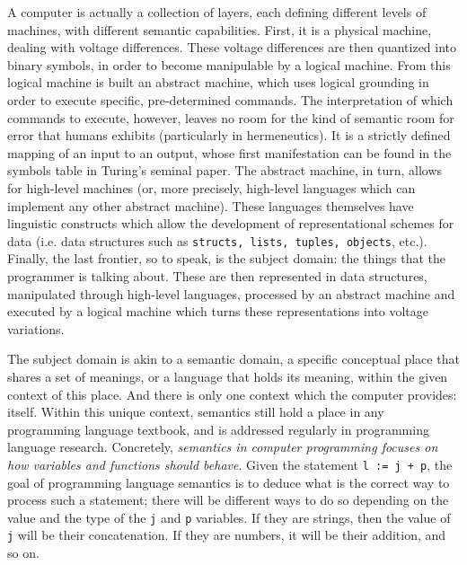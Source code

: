 \documentclass{article}
\begin{document}
A computer is actually a collection of layers, each defining different levels of machines, with different semantic capabilities. First, it is a physical machine, dealing with voltage differences. These voltage differences are then quantized into binary symbols, in order to become manipulable by a logical machine. From this logical machine is built an abstract machine, which uses logical grounding in order to execute specific, pre-determined commands. The interpretation of which commands to execute, however, leaves no room for the kind of semantic room for error that humans exhibits (particularly in hermeneutics). It is a strictly defined mapping of an input to an output, whose first manifestation can be found in the symbols table in Turing's seminal paper. The abstract machine, in turn, allows for high-level machines (or, more precisely, high-level languages which can implement any other abstract machine). These languages themselves have linguistic constructs which allow the development of representational schemes for data (i.e. data structures such as \lstinline{structs, lists, tuples, objects}, etc.). Finally, the last frontier, so to speak, is the subject domain: the things that the programmer is talking about. These are then represented in data structures, manipulated through high-level languages, processed by an abstract machine and executed by a logical machine which turns these representations into voltage variations.

The subject domain is akin to a semantic domain, a specific conceptual place that shares a set of meanings, or a language that holds its meaning, within the given context of this place. And there is only one context which the computer provides: itself. Within this unique context, semantics still hold a place in any programming language textbook, and is addressed regularly in programming language research. Concretely, \emph{semantics in computer programming focuses on how variables and functions should behave}\cite{sethi_programming_1996}. Given the statement \lstinline{l := j + p}, the goal of programming language semantics is to deduce what is the correct way to process such a statement; there will be different ways to do so depending on the value and the type of the \lstinline{j} and \lstinline{p} variables. If they are strings, then the value of \lstinline{j} will be their concatenation. If they are numbers, it will be their addition, and so on.
\end{document}
